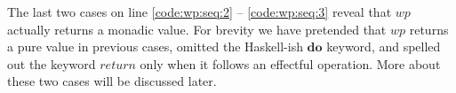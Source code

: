 \documentclass[runningheads]{llncs}
\newcommand{\Varid}[1]{\mathit{#1}}
\let\Varid\mathit
\newcommand{\todo}[1]{{\bf Todo}: \lbrack #1 \rbrack}
\begin{document}
The last two cases on line \ref{code:wp:seq:2} -- \ref{code:wp:seq:3} reveal that \ensuremath{\Varid{wp}} actually returns a monadic value.
For brevity we have pretended that \ensuremath{\Varid{wp}} returns a pure value in previous cases,
omitted the Haskell-ish \ensuremath{\mathbf{do}} keyword,
and spelled out the keyword \ensuremath{\Varid{return}} only when it follows an effectful operation.
More about these two cases will be discussed later.

\end{document}
